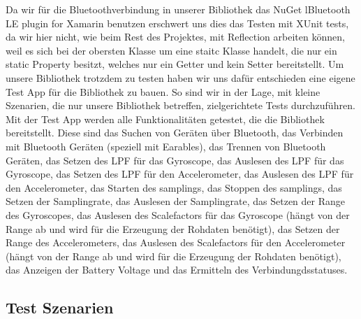 \documentclass[a4paper,12pt]{article}
\begin{document}
Da wir für die Bluetoothverbindung in unserer Bibliothek das NuGet \glqq{}lBluetooth LE plugin for Xamarin\grqq{} benutzen erschwert uns dies das Testen mit XUnit tests, da wir hier nicht, wie beim Rest des Projektes, mit Reflection arbeiten können, weil es sich bei der \glqq{}obersten Klasse\grqq{} um eine staitc Klasse handelt, die nur ein static Property besitzt, welches nur ein Getter und kein Setter bereitstellt. Um unsere Bibliothek trotzdem zu testen haben wir uns dafür entschieden eine eigene Test App für die Bibliothek zu bauen. So sind wir in der Lage, mit kleine Szenarien, die nur unsere Bibliothek betreffen, zielgerichtete Tests durchzuführen.
Mit der Test App werden alle Funktionalitäten getestet, die die Bibliothek bereitstellt. Diese sind das Suchen von Geräten über Bluetooth, das Verbinden mit Bluetooth Geräten (speziell mit Earables), das Trennen von Bluetooth Geräten, das Setzen des LPF für das Gyroscope, das Auslesen des LPF für das Gyroscope, das Setzen des LPF für den Accelerometer, das Auslesen des LPF für den Accelerometer, das Starten des samplings, das Stoppen des samplings, das Setzen der Samplingrate, das Auslesen der Samplingrate, das Setzen der Range des Gyroscopes, das Auslesen des Scalefactors für das Gyroscope (hängt von der Range ab und wird für die Erzeugung der Rohdaten benötigt), das Setzen der Range des Accelerometers, das Auslesen des Scalefactors für den Accelerometer (hängt von der Range ab und wird für die Erzeugung der Rohdaten benötigt), das Anzeigen der Battery Voltage und das Ermitteln des Verbindungdsstatuses.

\subsection{Test Szenarien}
\end{document}
